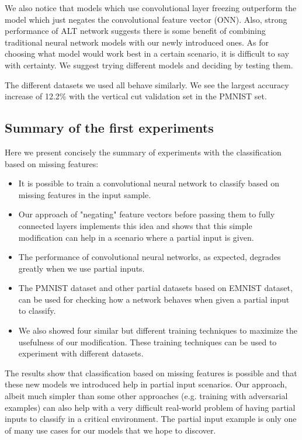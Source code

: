 \documentclass[b5paper]{book}
\begin{document}
We also notice that models which use convolutional layer freezing outperform the model which just negates the convolutional feature vector (ONN). Also, strong performance of ALT network suggests there is some benefit of combining traditional neural network models with our newly introduced ones. As for choosing what model would work best in a certain scenario, it is difficult to say with certainty. We suggest trying different models and deciding by testing them. 

The different datasets we used all behave similarly. We see the largest accuracy increase of 12.2\% with the vertical cut validation set in the PMNIST set.

\subsection{Summary of the first experiments}

Here we present concisely the summary of experiments with the classification based on missing features:

\begin{itemize}
  \item It is possible to train a convolutional neural network to classify based on missing features in the input sample.
  \item Our approach of "negating" feature vectors before passing them to fully connected layers implements this idea and shows that this simple modification can help in a scenario where a partial input is given.
  \item The performance of convolutional neural networks, as expected, degrades greatly when we use partial inputs. 
  \item The PMNIST dataset and other partial datasets based on EMNIST dataset, can be used for checking how a network behaves when given a partial input to classify.
  \item We also showed four similar but different training techniques to maximize the usefulness of our modification. These training techniques can be used to experiment with different datasets.
\end{itemize}

The results show that classification based on missing features is possible and that these new models we introduced help in partial input scenarios. Our approach, albeit much simpler than some other approaches (e.g. training with adversarial examples) can also help with a very difficult real-world problem of having partial inputs to classify in a critical environment. The partial input example is only one of many use cases for our models that we hope to discover.
\end{document}
